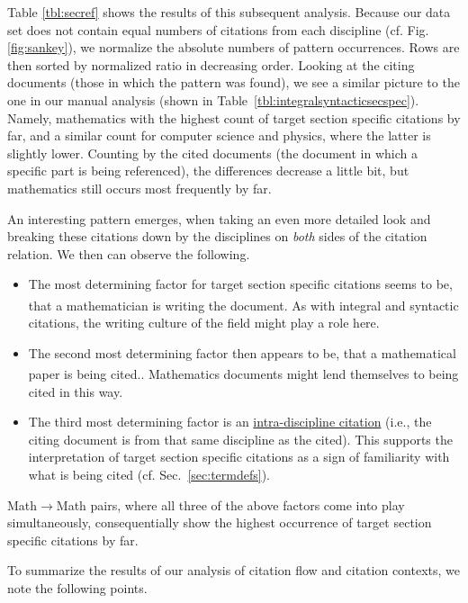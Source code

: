 Table \ref{tbl:secref} shows the results of this subsequent analysis. Because our data set does not contain equal numbers of citations from each discipline (cf. Fig. \ref{fig:sankey}), we normalize the absolute numbers of pattern occurrences. Rows are then sorted by normalized ratio in decreasing order. Looking at the citing documents (those in which the pattern was found), we see a similar picture to the one in our manual analysis (shown in Table~\ref{tbl:integralsyntacticsecspec}). Namely, mathematics with the highest count of target section specific citations by far, and a similar count for computer science and physics, where the latter is slightly lower. Counting by the cited documents (the document in which a specific part is being referenced), the differences decrease a little bit, but mathematics still occurs most frequently by far.

An interesting pattern emerges, when taking an even more detailed look and breaking these citations down by the disciplines on \emph{both} sides of the citation relation. We then can observe the following.
\begin{itemize}
 \item The most determining factor for target section specific citations seems to be, that a mathematician is writing the document.\textsuperscript{\textdagger} As with integral and syntactic citations, the writing culture of the field might play a role here.
 \item The second most determining factor then appears to be, that a mathematical paper is being cited.\textsuperscript{\textdaggerdbl}. Mathematics documents might lend themselves to being cited in this way.
 \item The third most determining factor is an \underline{intra-discipline citation} (i.e., the citing document is from that same discipline as the cited). This supports the interpretation of target section specific citations as a sign of familiarity with what is being cited (cf. Sec.~\ref{sec:termdefs}).
\end{itemize}

Math$\rightarrow$Math pairs, where all three of the above factors come into play simultaneously, consequentially show the highest occurrence of target section specific citations by far.

To summarize the results of our analysis of citation flow and citation contexts, we note the following points.

